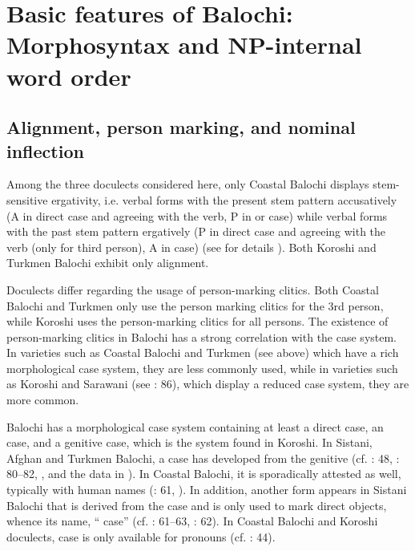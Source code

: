 \documentclass[output=paper,colorlinks,citecolor=brown,draftmode]{langscibook}
\begin{document}
\section{Basic features of Balochi: Morphosyntax and NP-internal word order}\label{Balochi:ss:3}

\subsection{Alignment, person marking, and nominal inflection}\label{Balochi:ss:3.1}

\begin{sloppypar}
Among the three doculects considered here, only Coastal Balochi displays stem-sensitive ergativity, i.e. verbal forms with the present stem pattern accusatively (A in direct case and agreeing with the verb, P in  or  case) while verbal forms with the past stem pattern ergatively (P in direct case and agreeing with the verb (only for third person), A in  case) (see for details \citealt{nourzaei_participant_2017}). Both Koroshi and Turkmen Balochi exhibit only  alignment.
\end{sloppypar}

Doculects differ regarding the usage of person-marking clitics. Both Coastal Balochi and Turkmen only use the person marking clitics for the 3rd person, while Koroshi uses the person-marking clitics for all persons. The existence of person-marking clitics in Balochi has a strong correlation with the case system. In varieties such as Coastal Balochi and Turkmen (see above) which have a rich morphological case system, they are less commonly used, while in varieties such as Koroshi and Sarawani (see \citealt{baranzehi_sarawani_2003}: 86), which display a reduced case system, they are more common. 

Balochi has a morphological case system containing at least a direct case, an  case, and a genitive case, which is the system found in Koroshi. In Sistani, Afghan and Turkmen Balochi, a  case has developed from the genitive (cf. \citealt{buddruss_aus_1988}: 48, \citealt{axenov_balochi_2006}: 80--82, \citealt{korn_new_2008}, and the data in \citealt{barjasteh_delforooz_discourse_2010}). In Coastal Balochi, it is sporadically attested as well, typically with human names (\citealt{nourzaei_participant_2017}: 61, \citealt{korn_notes_2019}). In addition, another form appears in Sistani Balochi that is derived from the  case and is only used to mark direct objects, whence its name, `` case'' (cf. \citealt{korn_new_2008}: 61--63, \citealt{nourzaei_participant_2017}: 62). In Coastal Balochi and Koroshi doculects,  case is only available for pronouns (cf. \citealt{nourzaei_participant_2017}: 44).
\end{document}
